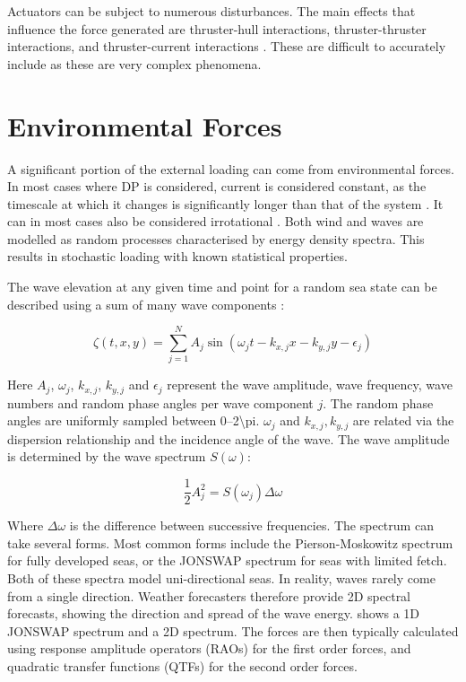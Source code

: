 Actuators can be subject to numerous disturbances. The main effects that influence the force generated are
thruster-hull interactions, thruster-thruster interactions, and thruster-current interactions
\parencite{serrarisTimeDomainAnalysis2009}. These are difficult to accurately include as these are very complex
phenomena.


\section{Environmental Forces}
\label{sec:environmental_forces}
A significant portion of the external loading can come from environmental forces. In most cases where DP is considered, current is
considered constant, as the timescale at which it changes is significantly longer than that of the system
\parencite{RecommendedPracticeEnvironmental2019}. It can in most cases also be considered irrotational
\parencite{fossenManouveringModels2014}. Both wind and waves are modelled as random processes characterised by energy
density spectra. This results in stochastic loading with known statistical properties.

The wave elevation at any given time and point for a random sea state can be described using a sum of many wave
components \parencite{faltinsenSeaLoadsShips1999}:

\begin{equation}
    \label{eq:wave_superposition}
    \zeta(t, x, y) = \sum_{j = 1}^N A_j \sin \left(\omega_j t - k_{x, j}x - k_{y, j}y - \epsilon_j\right)
\end{equation}

Here \(A_j\), \(\omega_j\), \(k_{x, j}\), \(k_{y, j}\) and \(\epsilon_j\) represent the wave amplitude, wave frequency,
wave numbers and random phase angles per wave component \(j\). The random phase angles are uniformly sampled between
\numrange{0}{2\pi}. \(\omega_j\) and \(k_{x, j}, k_{y, j}\) are related via the dispersion relationship and the
incidence angle of the wave. The wave amplitude is determined by the wave spectrum \(S(\omega)\):

\begin{equation}
    \label{eq:wave_amplitude_spectrum}
    \frac{1}{2} A_j^2 = S(\omega_j)\Delta \omega
\end{equation}

Where \(\Delta\omega\) is the difference between successive frequencies. The spectrum can take several forms. Most
common forms include the Pierson-Moskowitz spectrum for fully developed seas, or the JONSWAP spectrum for seas with
limited fetch. Both of these spectra model uni-directional seas. In reality, waves rarely come from a single direction.
Weather forecasters therefore provide 2D spectral forecasts, showing the direction and spread of the wave energy.
 shows a 1D JONSWAP spectrum and a 2D spectrum. The
forces are then typically calculated using response amplitude operators (RAOs) for the first order forces, and quadratic
transfer functions (QTFs) for the second order forces. 

